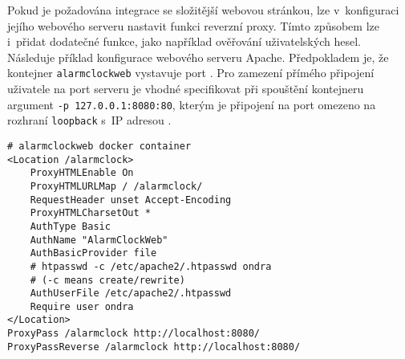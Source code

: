 Pokud je požadována integrace se složitější webovou stránkou, lze v~konfiguraci
jejího webového serveru nastavit funkci reverzní proxy. Tímto způsobem lze
i~přidat dodatečné funkce, jako například ověřování uživatelských hesel.
Následuje příklad konfigurace webového serveru Apache.
Předpokladem je, že kontejner \texttt{alarmclockweb} vystavuje port
. Pro zamezení přímého připojení uživatele na port 
serveru je vhodné specifikovat při spouštění kontejneru argument
\texttt{-p 127.0.0.1:8080:80}, kterým je připojení na port  omezeno
na rozhraní \texttt{loopback} s~IP adresou .
\begin{lstlisting}[language=hashcomment]
# alarmclockweb docker container
<Location /alarmclock>
    ProxyHTMLEnable On
    ProxyHTMLURLMap / /alarmclock/
    RequestHeader unset Accept-Encoding
    ProxyHTMLCharsetOut *
    AuthType Basic
    AuthName "AlarmClockWeb"
    AuthBasicProvider file
    # htpasswd -c /etc/apache2/.htpasswd ondra
    # (-c means create/rewrite)
    AuthUserFile /etc/apache2/.htpasswd
    Require user ondra
</Location>
ProxyPass /alarmclock http://localhost:8080/
ProxyPassReverse /alarmclock http://localhost:8080/
\end{lstlisting}

